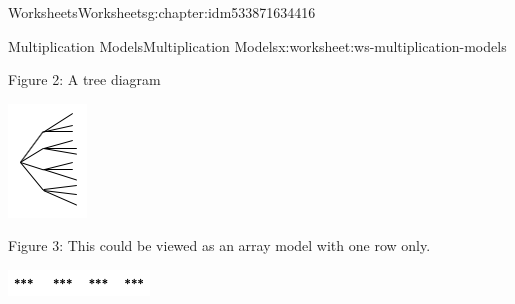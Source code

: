 \documentclass[twoside,11pt,]{book}
\begin{document}
\begin{chapterptx}{Worksheets}{}{Worksheets}{}{}{g:chapter:idm533871634416}
\begin{worksheet-section-numberless}{Multiplication Models}{}{Multiplication Models}{}{}{x:worksheet:ws-multiplication-models}
\begin{introduction}{}
\begin{description}
\begin{sidebyside}{1}{0.45}{0.45}{0}
\end{sidebyside}%
\item[{}]Figure 2: A tree diagram \begin{sidebyside}{1}{0.45}{0.45}{0}%
\begin{sbspanel}{0.1}%
\includegraphics[width=1\linewidth]{images/mult-tree.png}
\end{sbspanel}%
\end{sidebyside}%
\item[{}]Figure 3: This could be viewed as an array model with one row only. \begin{sidebyside}{1}{0.3}{0.3}{0}%
\begin{sbspanel}{0.4}%
\includegraphics[width=1\linewidth]{images/mult-one-row.png}

\end{sbspanel}
\end{sidebyside}
\end{description}
\end{introduction}
\end{worksheet-section-numberless}
\end{chapterptx}
\end{document}
